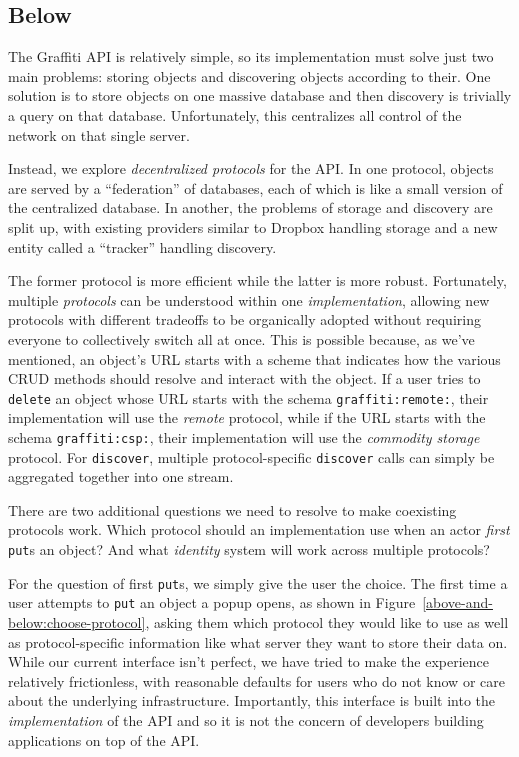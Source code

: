 \subsection{Below}

The Graffiti API is relatively simple,
so its implementation must solve just two main problems:
storing objects and discovering objects according to their.
One solution is to store objects on one massive database
and then discovery is trivially a query on that database.
Unfortunately, this centralizes all control of the network
on that single server.

Instead, we explore \emph{decentralized protocols} for the API.
In one protocol, objects are served by a ``federation'' of databases,
each of which is like a small version of the centralized database.
In another, the problems of storage and discovery are split up,
with existing providers similar to Dropbox handling storage
and a new entity called a ``tracker'' handling discovery.

The former protocol is more efficient while the latter is more robust.
Fortunately, multiple \emph{protocols} can be understood within one \emph{implementation},
allowing new protocols
with different tradeoffs to be organically adopted without requiring
everyone to collectively switch all at once.
This is possible because, as we've mentioned, an object's URL starts with a scheme that indicates
how the various CRUD methods should resolve and interact with the object.
If a user tries to \texttt{delete} an object whose URL starts with the schema
\texttt{graffiti:remote:}, their implementation will use the \emph{remote}
protocol, while if the URL starts with the schema \texttt{graffiti:csp:},
their implementation will use the \emph{commodity storage} protocol.
For \texttt{discover}, multiple protocol-specific \texttt{discover}
calls can simply be aggregated together into one stream.

There are two additional questions we need to resolve to
make coexisting protocols work.
Which protocol should an implementation use
when an actor \emph{first} \texttt{put}s an object?
And what \emph{identity} system will work across multiple
protocols?

For the question of first \texttt{put}s, we simply give the user the choice.
The first time a user attempts to \texttt{put} an object
a popup opens,
as shown in Figure~\ref{above-and-below:choose-protocol},
asking them which protocol they would like to use
as well as protocol-specific information like what server
they want to store their data on.
While our current interface isn't perfect,
we have tried to make the experience relatively frictionless, with
reasonable defaults for
users who do not know or care about the underlying infrastructure.
Importantly, this interface is built into the \emph{implementation}
of the API and so it is not the concern of developers building
applications on top of the API.

